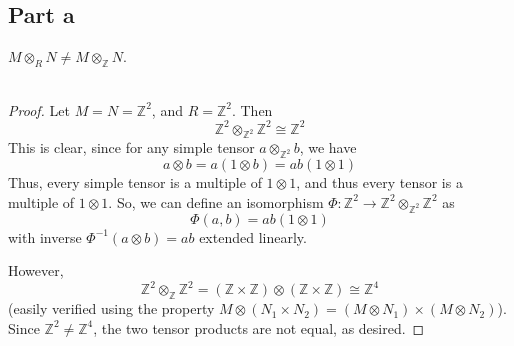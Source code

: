 \documentclass[12pt,reqno]{amsart}
\newcommand{\Z}{\mathbb{Z}}
\begin{document}
\subsection*{Part a}
$M\otimes_R N\neq M\otimes_{\Z} N$.
\\
\\
\begin{proof}
    Let $M=N=\Z^2$, and $R=\Z^2$. Then
    \[
        \Z^2\otimes_{\Z^2}\Z^2\cong \Z^2
    \]
    This is clear, since for any simple tensor $a\otimes_{\Z^2}b$, we have
    \[
        a\otimes b = a(1\otimes b) = ab(1\otimes 1)
    \]
    Thus, every simple tensor is a multiple of $1\otimes 1$, and thus every
    tensor is a multiple of $1\otimes 1$. So, we can define an isomorphism
    $\Phi:\Z^2\to \Z^2\otimes_{\Z^2}\Z^{2}$ as
    \[
        \Phi(a,b) = ab(1\otimes 1)
    \]
    with inverse $\Phi^{-1}(a\otimes b) = ab$ extended linearly.

    However,
    \[
        \Z^2\otimes_{\Z}\Z^2 = (\Z\times \Z)\otimes(\Z\times\Z)\cong \Z^4
    \]
    (easily verified using the property $M\otimes(N_1\times N_2) = (M\otimes
    N_1)\times(M\otimes N_2)$). Since $\Z^2\neq \Z^4$, the two tensor products
    are not equal, as desired.
\end{proof}
\end{document}
